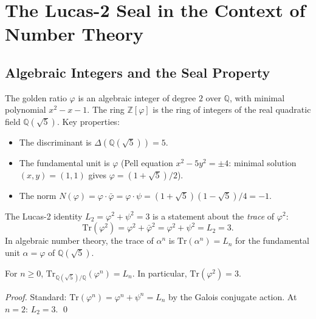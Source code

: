 \section{The Lucas-2 Seal in the Context of Number Theory}
\label{sec:gs-nt}

\subsection{Algebraic Integers and the Seal Property}

The golden ratio $\varphi$ is an algebraic integer of degree
$2$ over $\mathbb{Q}$, with minimal polynomial $x^2 - x - 1$.
The ring $\mathbb{Z}[\varphi]$ is the ring of integers of the
real quadratic field $\mathbb{Q}(\sqrt{5})$.  Key properties:

\begin{itemize}
  \item The discriminant is $\Delta(\mathbb{Q}(\sqrt{5})) = 5$.
  \item The fundamental unit is $\varphi$ (Pell equation
        $x^2 - 5y^2 = \pm 4$: minimal solution $(x,y) = (1,1)$
        gives $\varphi = (1+\sqrt{5})/2$).
  \item The norm $N(\varphi) = \varphi \cdot \bar\varphi
        = \varphi \cdot \psi = (1+\sqrt{5})(1-\sqrt{5})/4
        = -1$.
\end{itemize}

The Lucas-2 identity $L_2 = \varphi^2 + \psi^2 = 3$ is a
statement about the \emph{trace} of $\varphi^2$:
\[
  \text{Tr}(\varphi^2)
  = \varphi^2 + \bar\varphi^2
  = \varphi^2 + \psi^2
  = L_2 = 3.
\]
In algebraic number theory, the trace of $\alpha^n$ is
$\text{Tr}(\alpha^n) = L_n$ for the fundamental unit $\alpha
= \varphi$ of $\mathbb{Q}(\sqrt{5})$.

\begin{theorem}\label{thm:trace-seal}
For $n \geq 0$, $\text{Tr}_{\mathbb{Q}(\sqrt{5})/\mathbb{Q}}(\varphi^n) = L_n$.
In particular, $\text{Tr}(\varphi^2) = 3$.
\end{theorem}

\begin{proof}
Standard: $\text{Tr}(\varphi^n) = \varphi^n + \psi^n = L_n$
by the Galois conjugate action.  At $n = 2$: $L_2 = 3$.
\qed
\end{proof}

